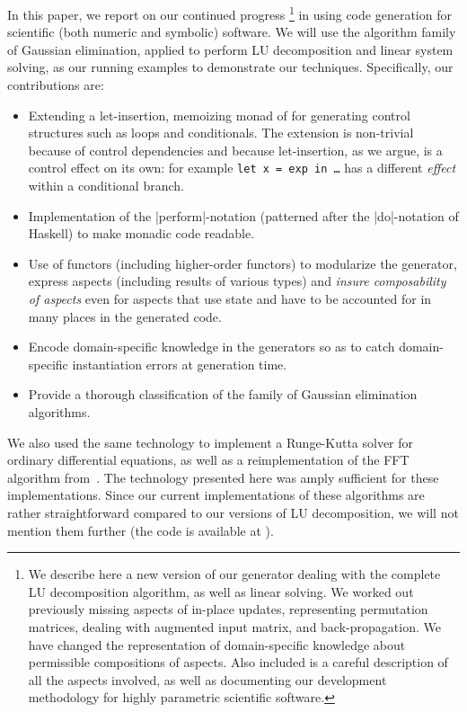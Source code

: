 \documentclass{elsart}
\begin{document}
In this paper, we report on our continued progress \cite{CaretteKiselyov05}%
\footnote{We describe here a new version of our generator
  dealing with the complete LU decomposition algorithm, as well as
  linear solving. We worked out previously missing aspects of in-place
  updates, representing permutation matrices, dealing with augmented 
  input matrix, and back-propagation. We have changed the representation
  of domain-specific knowledge about permissible compositions of aspects.
  Also included is a careful description of all the aspects involved, as
  well as documenting our development methodology for highly parametric
  scientific software.}
in using code generation for scientific (both numeric and symbolic)
software.  We will use the algorithm family of Gaussian elimination, 
applied to perform LU decomposition 
and linear system solving, as our running examples to demonstrate our
techniques.  Specifically, our contributions are:
\begin{itemize}
    \item Extending a let-insertion, memoizing monad of
      \cite{KiselyovTaha,SwadiMonadic06} for generating control structures
      such as loops and conditionals. The extension is non-trivial
      because of control dependencies and because let-insertion, as we argue,
      is a control effect on its own: for example
      \texttt{let x = exp in \dots} has a different \emph{effect} within a
      conditional branch.
    \item Implementation of the |perform|-notation (patterned after
      the |do|-notation of Haskell) to make monadic code readable.
    \item Use of functors (including higher-order functors) to
      modularize the generator, express aspects (including results of
      various types) and \emph{insure composability of aspects} even
      for aspects that use state and have to be accounted for in many
      places in the generated code.
    \item Encode domain-specific knowledge in the generators so as to
      catch domain-specific instantiation errors at generation
      time.
    \item Provide a thorough classification of the family of Gaussian
    elimination algorithms.
\end{itemize}

We also used the same technology to implement a Runge-Kutta solver for
ordinary differential equations, as well as a reimplementation of
the FFT algorithm from~\cite{KiselyovTaha}.  The technology presented
here was amply sufficient for these implementations.  Since our current
implementations of these algorithms are rather straightforward compared to 
our versions of LU decomposition, we will not mention them further 
(the code is available at \cite{metamonadsURL}).
\end{document}
